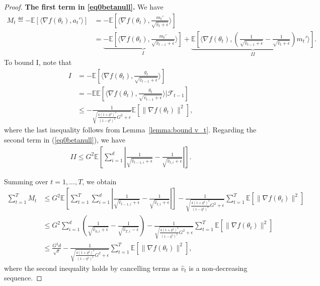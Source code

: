 \documentclass[11pt]{article}
\begin{document}
\begin{proof}
\textbf{The first term in \eqref{eq0betanull}.} We have
\begin{align*}
    M_t\eqdef -\mathbb E[\langle \nabla f(\theta_t), a_t'\rangle]&=-\mathbb E[\langle \nabla f(\theta_t), \frac{m_t'}{\sqrt{\hat v_t+\epsilon}}\rangle]\\
    &=\underbrace{-\mathbb E[\langle \nabla f(\theta_t), \frac{m_t'}{\sqrt{\hat v_{t-1}+\epsilon}} \rangle]}_{I}+\underbrace{\mathbb E[\langle \nabla f(\theta_t), (\frac{1}{\sqrt{\hat v_{t-1}+\epsilon}}-\frac{1}{\sqrt{\hat v_t+\epsilon}})m_t' \rangle]}_{II}.
\end{align*}
To bound I, note that
\begin{align}
    I&=-\mathbb E[\langle \nabla f(\theta_t), \frac{g_t}{\sqrt{\hat v_{t-1}+\epsilon}} \rangle]  \nonumber\\
    &=-\mathbb E\mathbb E[\langle \nabla f(\theta_t), \frac{g_t}{\sqrt{\hat v_{t-1}+\epsilon}} \rangle|\mathcal F_{t-1}]  \nonumber\\
    &\leq -\frac{1}{\sqrt{\frac{4(1+q^2)^3}{(1-q^2)^2}G^2+\epsilon}}\mathbb E[\|\nabla f(\theta_t)\|^2],  \label{eq1}
\end{align}
where the last inequality follows from Lemma~\ref{lemma:bound v_t}. Regarding the second term in (\ref{eq0betanull}), we have
\begin{align*}
    II\leq G^2 \mathbb E[\sum_{i=1}^d |\frac{1}{\sqrt{\hat v_{t-1,i}+\epsilon}}-\frac{1}{\sqrt{\hat v_{t,i}+\epsilon}}| ] .
\end{align*}

Summing over $t=1,...,T$, we obtain
\begin{align*}
    \sum_{t=1}^T M_t  &\leq G^2\mathbb E[\sum_{t=1}^T\sum_{i=1}^d |\frac{1}{\sqrt{\hat v_{t-1,i}+\epsilon}}-\frac{1}{\sqrt{\hat v_{t,i}+\epsilon}}|] -\frac{1}{\sqrt{\frac{4(1+q^2)^3}{(1-q^2)^2}G^2+\epsilon}}     \sum_{t=1}^T\mathbb E[\|\nabla f(\theta_t)\|^2]\\
    &\leq G^2 \sum_{i=1}^d(\frac{1}{\sqrt{\hat v_{0,i}+\epsilon}}-\frac{1}{\sqrt{\hat v_{T,i}-\epsilon}})-\frac{1}{\sqrt{\frac{4(1+q^2)^3}{(1-q^2)^2}G^2+\epsilon}}     \sum_{t=1}^T\mathbb E[\|\nabla f(\theta_t)\|^2]\\
    &\leq \frac{G^2 d}{\sqrt\epsilon} -\frac{1}{\sqrt{\frac{4(1+q^2)^3}{(1-q^2)^2}G^2+\epsilon}}     \sum_{t=1}^T\mathbb E[\|\nabla f(\theta_t)\|^2],
\end{align*}
where the second inequality holds by cancelling terms as $\hat v_t$ is a non-decreasing sequence.


\end{proof}
\end{document}
